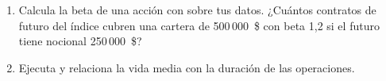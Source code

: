 \begin{ejercicios}
\begin{enumerate}
\item Calcula la beta de una acción con  sobre tus datos. ¿Cuántos contratos de futuro
  del índice cubren una cartera de 500\,000~\$ con beta 1,2 si el futuro tiene nocional 250\,000~\$?
\item Ejecuta  y relaciona la vida media con la duración de las operaciones.
\end{enumerate}
\end{ejercicios}
